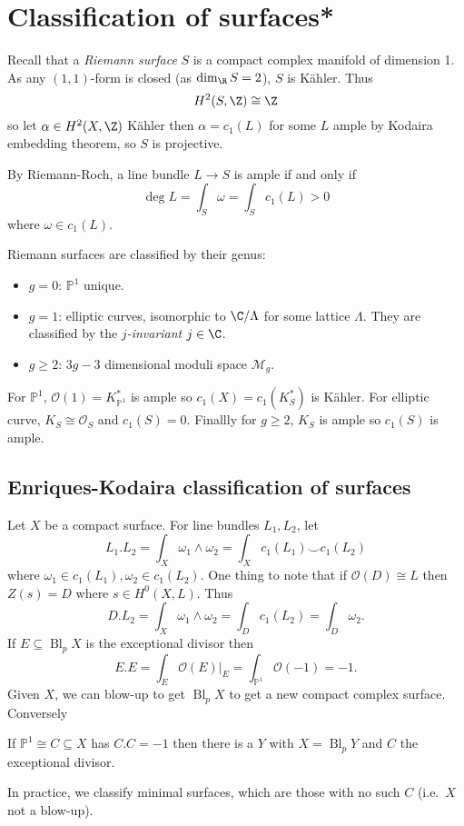 \documentclass[a4paper]{article}
\renewcommand{\P}{\mathbb P} %
\newcommand{\w}{\wedge} %
\DeclareMathOperator{\Bl}{Bl} %
\begin{document}
\section{Classification of surfaces*}

Recall that a \emph{Riemann surface} \(S\) is a compact complex manifold of dimension 1. As any \((1, 1)\)-form is closed (as \(\dim_\R S = 2\)), \(S\) is Kähler. Thus
\[
  H^2(S, \Z) \cong \Z
\]
so let \(\alpha \in H^2(X, \Z)\) Kähler then \(\alpha = c_1(L)\) for some \(L\) ample by Kodaira embedding theorem, so \(S\) is projective.

By Riemann-Roch, a line bundle \(L \to S\) is ample if and only if
\[
  \deg L = \int_S \omega = \int_S c_1(L) > 0
\]
where \(\omega \in c_1(L)\).

Riemann surfaces are classified by their genus:
\begin{itemize}
\item \(g = 0\): \(\P^1\) unique.
\item \(g = 1\): elliptic curves, isomorphic to \(\C/\Lambda\) for some lattice \(\Lambda\). They are classified by the \emph{\(j\)-invariant} \(j \in \C\).
\item \(g \geq 2\): \(3g - 3\) dimensional moduli space \(\mathcal M_g\).
\end{itemize}

For \(\P^1\), \(\mathcal O(1) = K^*_{\P^1}\) is ample so \(c_1(X) = c_1(K_S^*)\) is Kähler. For elliptic curve, \(K_S \cong \mathcal O_S\) and \(c_1(S) = 0\). Finallly for \(g \geq 2\), \(K_S\) is ample so \(c_1(S)\) is ample.

\subsection{Enriques-Kodaira classification of surfaces}

Let \(X\) be a compact surface. For line bundles \(L_1, L_2\), let
\[
  L_1 . L_2 = \int_X \omega_1 \w \omega_2 = \int_X c_1(L_1) \smile c_1(L_2)
\]
where \(\omega_1 \in c_1(L_1), \omega_2 \in c_1(L_2)\). One thing to note that if \(\mathcal O(D) \cong L\) then \(Z(s) = D\) where \(s \in H^0(X, L)\). Thus
\[
  D. L_2 = \int_X \omega_1 \w \omega_2 = \int_D c_1(L_2) = \int_D \omega_2.
\]
If \(E \subseteq \Bl_p X\) is the exceptional divisor then
\[
  E. E = \int_E \mathcal O(E)|_E = \int_{\P^1} \mathcal O(-1) = -1.
\]
Given \(X\), we can blow-up to get \(\Bl_p X\) to get a new compact complex surface. Conversely
\begin{theorem}[Castelnuovo]
  If \(\P^1 \cong C \subseteq X\) has \(C. C = -1\) then there is a \(Y\) with \(X = \Bl_pY\) and \(C\) the exceptional divisor.
\end{theorem}
In practice, we classify minimal surfaces, which are those with no such \(C\) (i.e.\ \(X\) not a blow-up).
\end{document}
